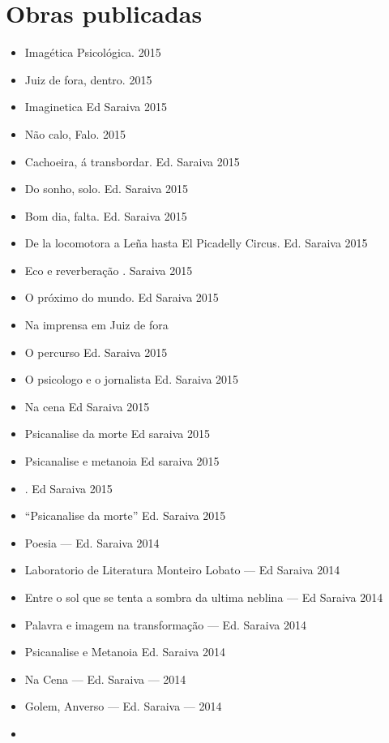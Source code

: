 
\backmatter

\chapter{Obras publicadas}

\begin{itemize}
\itemsep1pt\parskip0pt
\item
  Imagética Psicológica. 2015
\item
  Juiz de fora, dentro. 2015
\item
  Imaginetica Ed Saraiva 2015
\item
  Não calo, Falo. 2015
\item
  Cachoeira, á transbordar. Ed. Saraiva 2015
\item
  Do sonho, solo. Ed. Saraiva 2015
\item
  Bom dia, falta. Ed. Saraiva 2015
\item
  De la locomotora a Leña hasta El Picadelly Circus. Ed. Saraiva 2015
\item
  Eco e reverberação . Saraiva 2015
\item
  O próximo do mundo. Ed Saraiva 2015
\item
  Na imprensa em Juiz de fora
\item
  O percurso Ed. Saraiva 2015
\item
  O psicologo e o jornalista Ed. Saraiva 2015
\item
  Na cena Ed Saraiva 2015
\item
  Psicanalise da morte Ed saraiva 2015
\item
  Psicanalise e metanoia Ed saraiva 2015
\item
    . Ed Saraiva 2015
\item
  ``Psicanalise da morte'' Ed. Saraiva 2015
\item
  Poesia --- Ed. Saraiva 2014
\item
  Laboratorio de Literatura Monteiro Lobato --- Ed Saraiva 2014
\item
  Entre o sol que se tenta a sombra da ultima neblina --- Ed Saraiva
  2014
\item
  Palavra e imagem na transformação --- Ed. Saraiva 2014
\item
  Psicanalise e Metanoia Ed. Saraiva 2014
\item
  Na Cena --- Ed. Saraiva --- 2014
\item
  Golem, Anverso --- Ed. Saraiva --- 2014
\item

\end{itemize}
